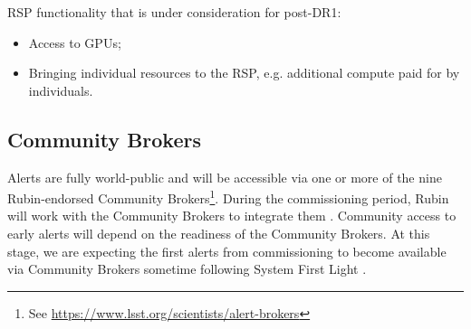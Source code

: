 RSP functionality that is under consideration for post-DR1:
\begin{itemize}
\item Access to GPUs;
\item Bringing individual resources to the RSP, e.g. additional compute paid for by individuals.
\end{itemize}

\subsection{Community Brokers}
\label{ssec:brokers}
Alerts are fully world-public and will be accessible via one or more of the nine Rubin-endorsed Community Brokers\footnote{See \url{https://www.lsst.org/scientists/alert-brokers}}.
During the commissioning period, Rubin will work with the Community Brokers to integrate them .
Community access to early alerts will depend on the readiness of the Community Brokers.
At this stage, we are expecting the first alerts from commissioning to become available via Community Brokers sometime following System First Light .
